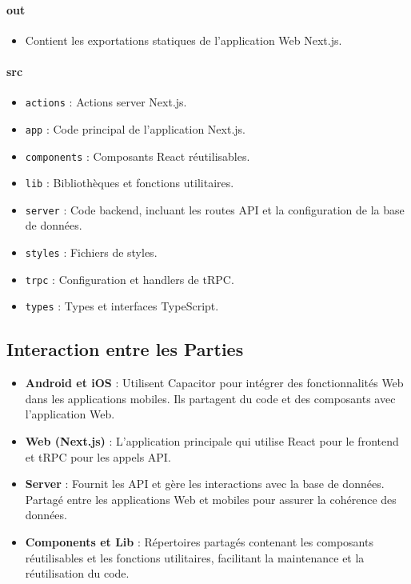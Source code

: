 \paragraph{out}
\begin{itemize}
    \item Contient les exportations statiques de l'application Web Next.js.
\end{itemize}

\paragraph{src}
\begin{itemize}
    \item \texttt{actions} : Actions server Next.js.
    \item \texttt{app} : Code principal de l'application Next.js.
    \item \texttt{components} : Composants React réutilisables.
    \item \texttt{lib} : Bibliothèques et fonctions utilitaires.
    \item \texttt{server} : Code backend, incluant les routes API et la configuration de la base de données.
    \item \texttt{styles} : Fichiers de styles.
    \item \texttt{trpc} : Configuration et handlers de tRPC.
    \item \texttt{types} : Types et interfaces TypeScript.
\end{itemize}

\subsection*{Interaction entre les Parties}

\begin{itemize}
    \item \textbf{Android et iOS} : Utilisent Capacitor pour intégrer des
      fonctionnalités Web dans les applications mobiles. Ils partagent du code
      et des composants avec l'application Web.
    \item \textbf{Web (Next.js)} : L'application principale qui utilise React
      pour le frontend et tRPC pour les appels API.
    \item \textbf{Server} : Fournit les API et gère les interactions avec la
      base de données. Partagé entre les applications Web et mobiles pour
      assurer la cohérence des données.
    \item \textbf{Components et Lib} : Répertoires partagés contenant les
      composants réutilisables et les fonctions utilitaires, facilitant la
      maintenance et la réutilisation du code.
\end{itemize}

